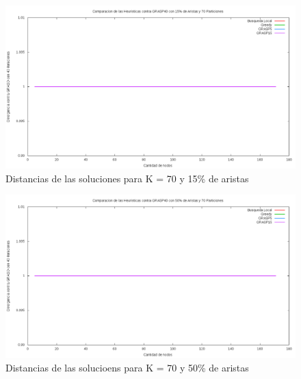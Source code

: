 \begin{figure}[H]
\begin{center}
\includegraphics[scale=0.4]{finales/muchosComparacionesCon70Particiones15Aristas.png}
\caption{Distancias de las soluciones para K = 70 y 15\% de aristas}
\end{center}
\end{figure}

\begin{figure}[H]
\begin{center}
\includegraphics[scale=0.4]{finales/muchosComparacionesCon70Particiones50Aristas.png}
\caption{Distancias de las solucioens para K = 70 y 50\% de aristas}
\end{center}
\end{figure}

